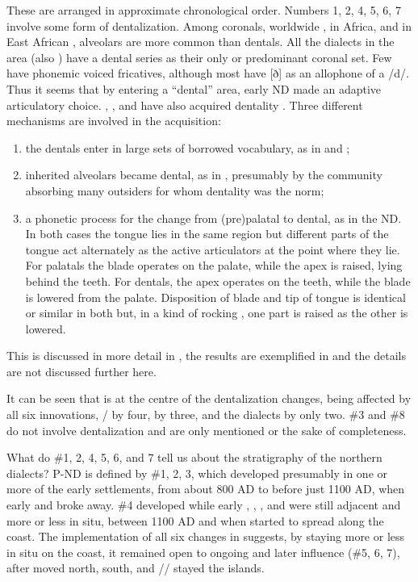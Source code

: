 \documentclass[output=paper
,newtxmath
,modfonts
,nonflat]{langsci/langscibook}
\begin{document}
These are arranged in approximate chronological order. Numbers 1, 2, 4, 5, 6, 7 involve some form of dentalization. Among coronals, worldwide \citep{Maddieson1984}, in Africa, and in East African , alveolars are more common than dentals. All the  dialects in the area (also ) have a dental series as their only or predominant coronal set. Few have phonemic voiced fricatives, although most have [ð] as an allophone of a /d/. Thus it seems that by entering a  “dental” area, early ND made an adaptive articulatory choice. , , and  have also acquired dentality \citep[572-5]{Nurse1993}. Three different mechanisms are involved in the acquisition: 

\begin{enumerate}
	
\item the dentals enter in large sets of borrowed vocabulary, as in  and ;
\item inherited alveolars became dental, as in , presumably by the community absorbing many outsiders for whom dentality was the norm; 
\item a phonetic process for the change from (pre)palatal to dental, as in the ND. In both cases the tongue lies in the same region but different parts of the tongue act alternately as the active articulators at the point where they lie. For palatals the blade operates on the palate, while the apex is raised, lying behind the teeth. For dentals, the apex operates on the teeth, while the blade is lowered from the palate. Disposition of blade and tip of tongue is identical or similar in both but, in a kind of rocking , one part is raised as the other is lowered.   

\end{enumerate}


This is discussed in more detail in \citealt{Nurse1985}, the results are exemplified in \citet[572-575]{Nurse1993} and the details are not discussed further here. 

 It can be seen that  is at the centre of the dentalization changes, being affected by all six innovations, / by four,  by three,  and the  dialects by only two. \#3 and \#8 do not involve dentalization and are only mentioned or the sake of completeness. 

  What do \#1, 2, 4, 5, 6, and 7 tell us about the stratigraphy of the northern dialects? P-ND is defined by \#1, 2, 3, which developed presumably in one or more of the early settlements, from about 800 AD to before just 1100 AD, when early  and  broke away. \#4 developed while early , , , and  were still adjacent and more or less in situ, between 1100 AD and when  started to spread along the coast. The implementation of all six changes in  suggests, by staying more or less in situ on the coast, it remained open to ongoing and later  influence (\#5, 6, 7), after  moved north,  south, and // stayed the islands. 
\end{document}

